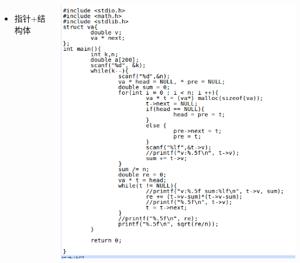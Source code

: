 \documentclass[color=usenames,dvipsnames]{beamer}
\begin{document}
{{\begin{columns}
     \column{0.6\hsize}
     \begin{itemize}
      \item 指针+结构体
     \end{itemize}
     \includegraphics[width=0.99\hsize]{pic/均方误差-good.png}
     \end{columns}
     }
}
\end{document}
